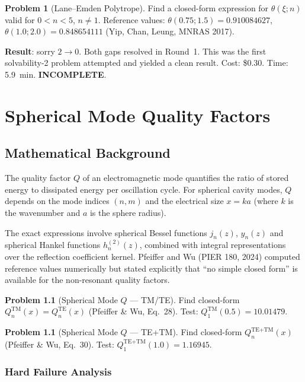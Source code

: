 \documentclass[12pt,a4paper]{report}
\theoremstyle{plain}
\theoremstyle{definition}
\newtheorem{problem}[theorem]{Problem}
\theoremstyle{remark}
\newcommand{\verdict}[1]{\textbf{\textcolor{inkblue}{#1}}}
\begin{document}
\begin{problem}[Lane--Emden Polytrope]
Find a closed-form expression for $\theta(\xi; n)$ valid for $0 < n < 5$, $n \neq 1$.
Reference values: $\theta(0.75; 1.5) = 0.910084627$, $\theta(1.0; 2.0) = 0.848654111$
(Yip, Chan, Leung, MNRAS 2017).
\end{problem}

\noindent\textbf{Result}: sorry $2 \to 0$. Both gaps resolved in Round~1.
This was the first solvability-2 problem attempted and yielded a clean result.
Cost: \$0.30. Time: 5.9~min. \verdict{INCOMPLETE}.

\chapter{Spherical Mode Quality Factors}
\label{ch:spherical}

\section{Mathematical Background}

The quality factor $Q$ of an electromagnetic mode quantifies the ratio of stored
energy to dissipated energy per oscillation cycle. For spherical cavity modes,
$Q$ depends on the mode indices $(n, m)$ and the electrical size $x = ka$
(where $k$ is the wavenumber and $a$ is the sphere radius).

The exact expressions involve spherical Bessel functions $j_n(z)$, $y_n(z)$ and
spherical Hankel functions $h_n^{(2)}(z)$, combined with integral representations
over the reflection coefficient kernel. Pfeiffer and Wu (PIER 180, 2024) computed
reference values numerically but stated explicitly that ``no simple closed form'' is
available for the non-resonant quality factors.

\begin{problem}[Spherical Mode $Q$ — TM/TE]
Find closed-form $Q_n^{\text{TM}}(x) = Q_n^{\text{TE}}(x)$ (Pfeiffer \& Wu, Eq.~28).
Test: $Q_1^{\text{TM}}(0.5) = 10.01479$.
\end{problem}

\begin{problem}[Spherical Mode $Q$ — TE+TM]
Find closed-form $Q_n^{\text{TE+TM}}(x)$ (Pfeiffer \& Wu, Eq.~30).
Test: $Q_1^{\text{TE+TM}}(1.0) = 1.16945$.
\end{problem}

\subsection{Hard Failure Analysis}
\end{document}
